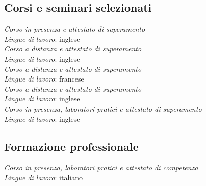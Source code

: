 \documentclass[
  a4paper, 
]{fortysecondscv}
\begin{document}
\subsection{Corsi e seminari selezionati}
\begin{cvtable}
		{{\small\emph{\small Corso in presenza e attestato di superamento}\\\textit{\small Lingue di lavoro}: inglese}\\[-0.8em]}
		{{\small\emph{\small Corso a distanza e attestato di superamento}\\\textit{\small Lingue di lavoro}: inglese}\\[-0.8em]}
		{{\small\emph{\small Corso a distanza e attestato di superamento}\\\textit{\small Lingue di lavoro}: francese}\\[-0.8em]}
		{{\small\emph{\small Corso a distanza e attestato di superamento}\\\textit{\small Lingue di lavoro}: inglese}\\[-0.8em]}
		{{\small\emph{\small Corso in presenza, laboratori pratici e attestato di superamento}\\\textit{\small Lingue di lavoro}: inglese}}
\end{cvtable}
\subsection{Formazione professionale}
\begin{cvtable}
		{{\small\emph{\small Corso in presenza, laboratori pratici e attestato di competenza}\\\textit{\small Lingue di lavoro}: italiano}}
\end{cvtable}
\end{document}
